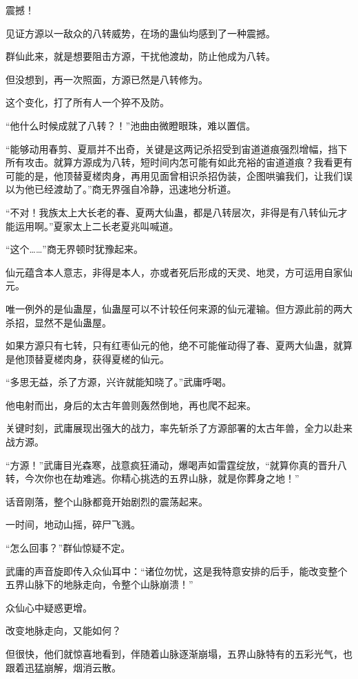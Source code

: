
\begin{this_body}

震撼！

见证方源以一敌众的八转威势，在场的蛊仙均感到了一种震撼。

群仙此来，就是想要阻击方源，干扰他渡劫，防止他成为八转。

但没想到，再一次照面，方源已然是八转修为。

这个变化，打了所有人一个猝不及防。

“他什么时候成就了八转？！”池曲由微瞪眼珠，难以置信。

“能够动用春剪、夏扇并不出奇，关键是这两记杀招受到宙道道痕强烈增幅，挡下所有攻击。就算方源成为八转，短时间内怎可能有如此充裕的宙道道痕？我看更有可能的是，他顶替夏槎肉身，再用见面曾相识杀招伪装，企图哄骗我们，让我们误以为他已经渡劫了。”商无界强自冷静，迅速地分析道。

“不对！我族太上大长老的春、夏两大仙蛊，都是八转层次，非得是有八转仙元才能运用啊。”夏家太上二长老夏兆叫喊道。

“这个……”商无界顿时犹豫起来。

仙元蕴含本人意志，非得是本人，亦或者死后形成的天灵、地灵，方可运用自家仙元。

唯一例外的是仙蛊屋，仙蛊屋可以不计较任何来源的仙元灌输。但方源此前的两大杀招，显然不是仙蛊屋。

如果方源只有七转，只有红枣仙元的他，绝不可能催动得了春、夏两大仙蛊，就算是他顶替夏槎肉身，获得夏槎的仙元。

“多思无益，杀了方源，兴许就能知晓了。”武庸呼喝。

他电射而出，身后的太古年兽则轰然倒地，再也爬不起来。

关键时刻，武庸展现出强大的战力，率先斩杀了方源部署的太古年兽，全力以赴来战方源。

“方源！”武庸目光森寒，战意疯狂涌动，爆喝声如雷霆绽放，“就算你真的晋升八转，今次你也在劫难逃。你精心挑选的五界山脉，就是你葬身之地！”

话音刚落，整个山脉都竟开始剧烈的震荡起来。

一时间，地动山摇，碎尸飞溅。

“怎么回事？”群仙惊疑不定。

武庸的声音旋即传入众仙耳中：“诸位勿忧，这是我特意安排的后手，能改变整个五界山脉下的地脉走向，令整个山脉崩溃！”

众仙心中疑惑更增。

改变地脉走向，又能如何？

但很快，他们就惊喜地看到，伴随着山脉逐渐崩塌，五界山脉特有的五彩光气，也跟着迅猛崩解，烟消云散。


\end{this_body}
